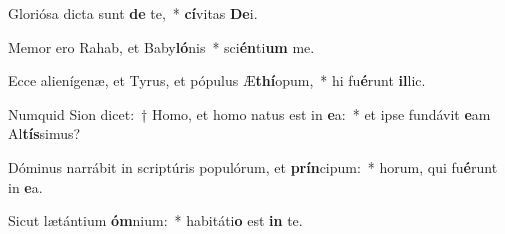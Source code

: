 \item Gloriósa dicta sunt \textbf{de} te,~* \textbf{cí}vitas \textbf{De}i.
\item Memor ero Rahab, et Baby\textbf{ló}nis~* sci\textbf{én}ti\textbf{um} me.
\item Ecce alienígenæ, et Tyrus, et pópulus Æ\textbf{thí}opum,~* hi fu\textbf{é}runt \textbf{il}lic.
\item Numquid Sion dicet:~† Homo, et homo natus est in \textbf{e}a:~* et ipse fundávit \textbf{e}am Al\textbf{tís}simus?
\item Dóminus narrábit in scriptúris populórum, et \textbf{prín}cipum:~* horum, qui fu\textbf{é}runt in \textbf{e}a.
\item Sicut lætántium \textbf{óm}nium:~* habitáti\textbf{o} est \textbf{in} te.
